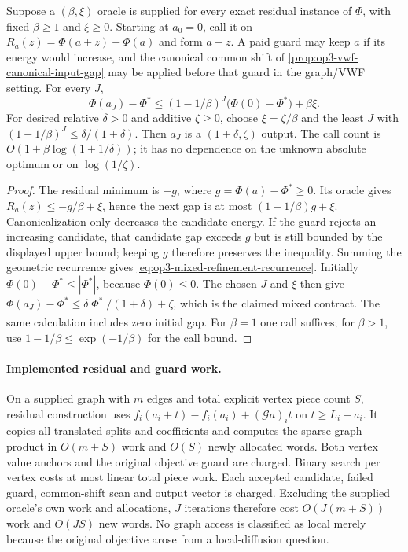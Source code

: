\begin{theorem}
\label{thm:op3-mixed-relative-refinement}
Suppose a $(\beta,\xi)$ oracle is supplied for every exact residual
instance of $\Phi$, with fixed $\beta\geq1$ and $\xi\geq0$.
Starting at $a_0=0$, call it on
$R_a(z)=\Phi(a+z)-\Phi(a)$ and form $a+z$.
A paid guard may keep $a$ if its energy would increase, and the canonical
common shift of \cref{prop:op3-vwf-canonical-input-gap} may be applied
before that guard in the graph/VWF setting. For every $J$,
\begin{equation}
 \Phi(a_J)-\Phi^*\leq
 (1-1/\beta)^J\bigl(\Phi(0)-\Phi^*\bigr)+\beta\xi.
 \label{eq:op3-mixed-refinement-recurrence}
\end{equation}
For desired relative $\delta>0$ and additive $\zeta\geq0$, choose
$\xi=\zeta/\beta$ and the least $J$ with
$(1-1/\beta)^J\leq\delta/(1+\delta)$.
Then $a_J$ is a $(1+\delta,\zeta)$ output.
The call count is $O(1+\beta\log(1+1/\delta))$; it has no dependence
on the unknown absolute optimum or on $\log(1/\zeta)$.
\end{theorem}
\begin{proof}
The residual minimum is $-g$, where $g=\Phi(a)-\Phi^*\geq0$.
Its oracle gives $R_a(z)\leq-g/\beta+\xi$, hence the next gap is at
most $(1-1/\beta)g+\xi$. Canonicalization only decreases the candidate
energy. If the guard rejects an increasing candidate, that candidate gap
exceeds $g$ but is still bounded by the displayed upper bound; keeping
$g$ therefore preserves the inequality. Summing the geometric recurrence
gives \eqref{eq:op3-mixed-refinement-recurrence}. Initially
$\Phi(0)-\Phi^*\leq|\Phi^*|$, because $\Phi(0)\leq0$.
The chosen $J$ and $\xi$ then give
$\Phi(a_J)-\Phi^*\leq\delta|\Phi^*|/(1+\delta)+\zeta$, which is
the claimed mixed contract. The same calculation includes zero initial
gap. For $\beta=1$ one call suffices; for $\beta>1$, use
$1-1/\beta\leq\exp(-1/\beta)$ for the call bound.
\end{proof}

\paragraph{Implemented residual and guard work.}
On a supplied graph with $m$ edges and total explicit vertex piece count
$S$, residual construction uses
$f_i(a_i+t)-f_i(a_i)+(\mathcal Ga)_it$ on $t\geq L_i-a_i$.
It copies all translated splits and coefficients and computes the sparse
graph product in $O(m+S)$ work and $O(S)$ newly allocated words.
Both vertex value anchors and the original objective guard are charged.
Binary search per vertex costs at most linear total piece work.
Each accepted candidate, failed guard, common-shift scan and output vector
is charged. Excluding the supplied oracle's own work and allocations,
$J$ iterations therefore cost $O(J(m+S))$ work and $O(JS)$ new words.
No graph access is classified as local merely because the original
objective arose from a local-diffusion question.

